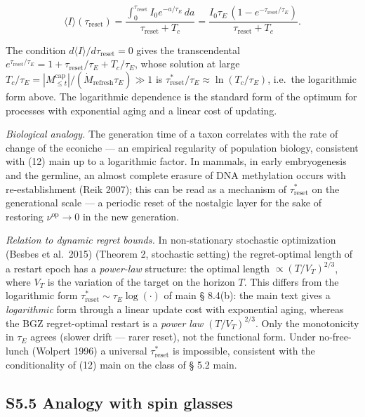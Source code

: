\documentclass[pdflatex,sn-mathphys-ay]{sn-jnl}
\begin{document}
\[\langle I\rangle(\tau_{\text{reset}}) = \frac{\int_0^{\tau_{\text{reset}}} I_0 e^{-a/\tau_E}\,da}{\tau_{\text{reset}} + T_c} = \frac{I_0\tau_E\,(1 - e^{-\tau_{\text{reset}}/\tau_E})}{\tau_{\text{reset}} + T_c}.\]



The condition \(d\langle I\rangle/d\tau_{\text{reset}} = 0\) gives the transcendental \(e^{\tau_{\text{reset}}/\tau_E} = 1 + \tau_{\text{reset}}/\tau_E + T_c/\tau_E\), whose solution at large \(T_c/\tau_E = |M_{\le t}^{\text{cap}}|/(\dot M_{\text{refresh}}\tau_E) \gg 1\) is \(\tau_{\text{reset}}^*/\tau_E \approx \ln(T_c/\tau_E)\), i.e.~the logarithmic form above. The logarithmic dependence is the standard form of the optimum for processes with exponential aging and a linear cost of updating.



\emph{Biological analogy.} The generation time of a taxon correlates with the rate of change of the econiche --- an empirical regularity of population biology, consistent with (12) main up to a logarithmic factor. In mammals, in early embryogenesis and the germline, an almost complete erasure of DNA methylation occurs with re-establishment (Reik 2007); this can be read as a mechanism of \(\tau_{\text{reset}}^*\) on the generational scale --- a periodic reset of the nostalgic layer for the sake of restoring \(\nu^{\text{op}} \to 0\) in the new generation.



\emph{Relation to dynamic regret bounds.} In non-stationary stochastic optimization (Besbes et al.~2015) (Theorem 2, stochastic setting) the regret-optimal length of a restart epoch has a \emph{power-law} structure: the optimal length \(\propto (T/V_T)^{2/3}\), where \(V_T\) is the variation of the target on the horizon \(T\). This differs from the logarithmic form \(\tau_{\text{reset}}^* \sim \tau_E \log(\cdot)\) of main § 8.4(b): the main text gives a \emph{logarithmic} form through a linear update cost with exponential aging, whereas the BGZ regret-optimal restart is a \emph{power law} \((T/V_T)^{2/3}\). Only the monotonicity in \(\tau_E\) agrees (slower drift --- rarer reset), not the functional form. Under no-free-lunch (Wolpert 1996) a universal \(\tau_{\text{reset}}^*\) is impossible, consistent with the conditionality of (12) main on the class of § 5.2 main.



\subsection*{S5.5 Analogy with spin glasses}\label{s5.5-analogy-with-spin-glasses}
\end{document}
